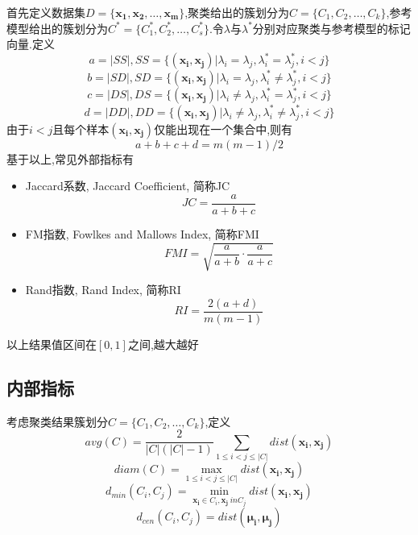 首先定义数据集$D=\{\mathbf{x_1, x_2, \dots, x_m}\}$,聚类给出的簇划分为$C=\{C_1, C_2, \dots, C_k\}$,参考模型给出的簇划分为$C^\ast=\{C_1^\ast, C_2^\ast, \dots, C_s^\ast\}$.令$\lambda$与$\lambda^\ast$分别对应聚类与参考模型的标记向量.定义
\begin{equation}
a=|SS|, SS=\{(\mathbf{x_i, x_j})|\lambda_i=\lambda_j, \lambda_i^\ast=\lambda_j^\ast, i<j\}
\end{equation}
\begin{equation}
b=|SD|, SD=\{(\mathbf{x_i, x_j})|\lambda_i=\lambda_j, \lambda_i^\ast\ne \lambda_j^\ast, i<j\}
\end{equation}
\begin{equation}
c=|DS|, DS=\{(\mathbf{x_i, x_j})|\lambda_i\ne\lambda_j, \lambda_i^\ast=\lambda_j^\ast, i<j\}
\end{equation}
\begin{equation}
d=|DD|, DD=\{(\mathbf{x_i, x_j})|\lambda_i\ne\lambda_j, \lambda_i^\ast\ne\lambda_j^\ast, i<j\}
\end{equation}
由于$i<j$且每个样本$(\mathbf{x_i, x_j})$仅能出现在一个集合中,则有
\begin{equation}
a+b+c+d=m(m-1)/2
\end{equation}
基于以上,常见外部指标有
\begin{itemize}
\item Jaccard系数, Jaccard Coefficient, 简称JC
    \begin{equation}
    JC=\frac{a}{a+b+c}
    \end{equation}
\item FM指数, Fowlkes and Mallows Index, 简称FMI
    \begin{equation}
    FMI=\sqrt{\frac{a}{a+b}\cdot\frac{a}{a+c}}
    \end{equation}
\item Rand指数, Rand Index, 简称RI
    \begin{equation}
    RI=\frac{2(a+d)}{m(m-1)}
    \end{equation}
\end{itemize}
以上结果值区间在$[0,1]$之间,越大越好

\subsection*{内部指标}

考虑聚类结果簇划分$C=\{C_1, C_2, \dots, C_k\}$,定义
\begin{equation}
avg(C)=\frac{2}{|C|(|C|-1)}\sum_{1\le i<j\le |C|}dist(\mathbf{x_i,x_j})
\end{equation}
\begin{equation}
diam(C)=\max_{1\le i<j\le |C|}dist(\mathbf{x_i,x_j})
\end{equation}
\begin{equation}
d_{min}(C_i,C_j)=\min_{\mathbf{x_i}\in C_i, \mathbf{x_j} \ in C_j}dist(\mathbf{x_i, x_j})
\end{equation}
\begin{equation}
d_{cen}(C_i, C_j)=dist(\mathbf{\mu_i, \mu_j})
\end{equation}

